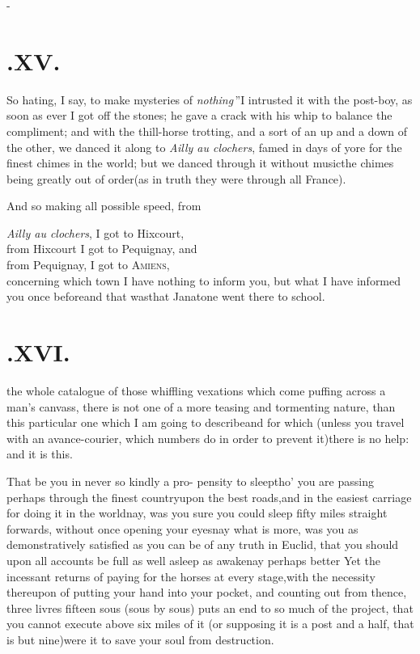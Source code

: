 \documentclass{article}
\begin{document}
\vfill{}\eject
\null\kern-\baselineskip
\section{.\enspace XV.}

\quad\tsh \lqq So hating, I say, to make\break
mysteries
of \textit{nothing}\,”\tsh I intrusted it with the
post-boy, as soon as ever I got off the stones; he gave a crack
with his whip to balance the compliment;\break
and with the thill-horse
trotting, and a sort of an up and a down of the other,\break
we danced it along to \textit{Ailly au clochers}, famed in days
of yore for the finest chimes in the world; but we danced
through it without music\tsk the chimes being greatly out of
order\tsk (as in truth they were through all France).

And so making all possible speed, from

\noindent
\textit{Ailly au clochers}, I got to Hixcourt,\\
\newpage\noindent
from Hixcourt I got to Pequignay, and\\
from Pequignay, I got to \textsc{Amiens},\\[4pt]
concerning which town I have nothing to inform you, but what I have
informed you once before\tsh and that was\tsh that
Janatone went there to school.

\section{.\enspace XVI.}

 the whole catalogue of those
whiff\-ling vexations which come puffing across a man’s
canvass, there is not one of a more teasing and tormenting nature,
than this particular one which I am going to
describe\tsh and for which (unless you travel with an
avance-courier, which numbers do in order to prevent
it)\tsh there is no help: and it is this.

That be you in never so kindly a pro-\break
pensity to sleep\tsh tho’ you are passing perhaps through the
finest country\tsk upon the best roads,\tsk and in the easiest
carriage for doing it in the world\tsh nay, was you sure you could sleep fifty miles straight
forwards, without once opening your eyes\tsk nay what is more,
was you as demonstratively satisfied as you can be of any truth in
Euclid, that you should upon all accounts be full as well
asleep as awake\tsh nay perhaps better\tsh\break
Yet the incessant returns of paying for the horses at every
stage,\tsh with the necessity thereupon of putting your
hand into your pocket, and counting out from thence, three livres
fifteen sous (sous by sous) puts an end to so much of the project,
that you cannot execute above six miles of it (or supposing it is a
post and a half, that is but nine)\tsh were it to save
your soul from destruction.
\end{document}
